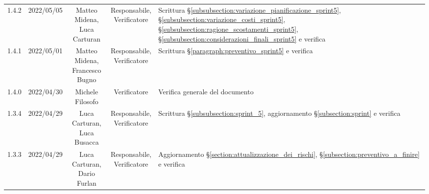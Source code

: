 \begin{center}
\begin{longtable}[c]{c | c | c | c | p{5cm}}
		1.4.2                                                      & 2022/05/05 & \Shortunderstack{Matteo Midena,                                                                                                                                                                     \\Luca Carturan} & \Shortunderstack{Responsabile,\\Verificatore} & Scrittura §\ref{subsubsection:variazione_pianificazione_sprint5}, §\ref{subsubsection:variazione_costi_sprint5}, §\ref{subsubsection:ragione_scostamenti_sprint5}, §\ref{subsubsection:considerazioni_finali_sprint5} e verifica\\
		1.4.1                                                      & 2022/05/01 & \Shortunderstack{Matteo Midena,                                                                                                                                                                     \\Francesco Bugno} & \Shortunderstack{Responsabile,\\Verificatore} & Scrittura §\ref{paragraph:preventivo_sprint5} e verifica\\
		1.4.0                                                      & 2022/04/30 & Michele Filosofo                       & Verificatore   & Verifica generale del documento                                                                                                           \\
		1.3.4                                                      & 2022/04/29 & \Shortunderstack{Luca Carturan,                                                                                                                                                                     \\Luca Busacca} & \Shortunderstack{Responsabile,\\Verificatore} & Scrittura §\ref{subsubsection:sprint_5}, aggiornamento §\ref{subsection:sprint} e verifica\\
		1.3.3                                                      & 2022/04/29 & \Shortunderstack{Luca Carturan,                                                                                                                                                                     \\Dario Furlan} & \Shortunderstack{Responsabile,\\Verificatore} & Aggiornamento §\ref{section:attualizzazione_dei_rischi}, §\ref{subsection:preventivo_a_finire} e verifica\\

\end{longtable}
\end{center}
